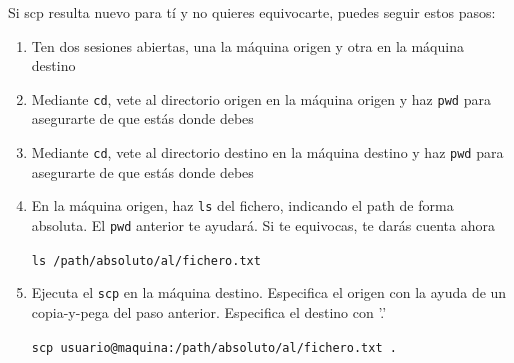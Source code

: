 \documentclass[ucs]{beamer}
\begin{document}
\begin{frame}[fragile]
Si scp resulta nuevo para tí y no quieres equivocarte, puedes
seguir estos pasos:
\begin{enumerate}
\item
Ten dos sesiones abiertas, una la máquina origen y otra en la máquina destino
\item
Mediante \verb|cd|, vete al directorio origen en la máquina origen 
y haz \verb|pwd| para asegurarte de que estás donde debes
\item
Mediante \verb|cd|, vete al directorio destino en la máquina destino 
y haz \verb|pwd| para asegurarte de que estás donde debes
\item
En la máquina origen, haz \verb|ls| del fichero, indicando el path de forma 
absoluta. El \verb|pwd| anterior te ayudará. Si te equivocas, te darás
cuenta ahora

\verb|ls /path/absoluto/al/fichero.txt|

\item
Ejecuta el \verb|scp| en la máquina destino. Especifica el origen con la ayuda
de un copia-y-pega del paso anterior. Especifica el destino con '.'

\verb|scp usuario@maquina:/path/absoluto/al/fichero.txt .|

\end{enumerate}

\end{frame}



\end{document}
